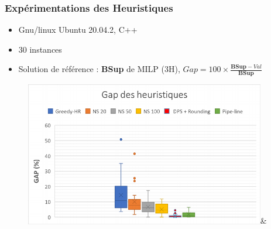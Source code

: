 \documentclass[hyperref={bookmarks=false},aspectratio=169]{beamer}
\begin{document}
\begin{frame}
\frametitle{Expérimentations des Heuristiques}%
\begin{itemize}
\item Gnu/linux Ubuntu 20.04.2, C++
\item 30 instances
\item Solution de référence : \textbf{BSup} de MILP (3H), $Gap=100 \times \frac{\textbf{BSup}-Val}{\textbf{BSup}}$
\end{itemize}

\begin{figure}[H]
	\centering
		\includegraphics[width=10.5cm]{figures/slide_Gap_Heuristiques_INST_VAR.pdf}&%
\end{figure}
\end{frame}
\end{document}

